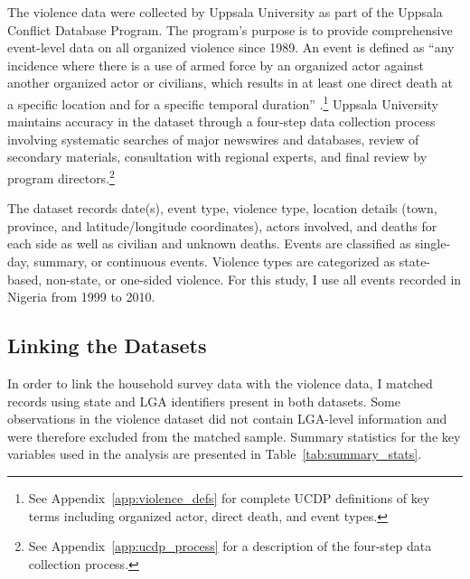 The violence data were collected by Uppsala University as part of the
Uppsala Conflict Database Program. The program's purpose is to provide
comprehensive event-level data on all organized violence since 1989. An
event is defined as ``any incidence where there is a use of armed force by
an organized actor against another organized actor or civilians, which
results in at least one direct death at a specific location and for a
specific temporal duration'' \citep{sundberg2010}.\footnote{See
Appendix~\ref{app:violence_defs} for complete UCDP definitions of key
terms including organized actor, direct death, and event types.} Uppsala
University maintains accuracy in the dataset through a four-step data
collection process involving systematic searches of major newswires and
databases, review of secondary materials, consultation with regional
experts, and final review by program directors.\footnote{See
Appendix~\ref{app:ucdp_process} for a description of the four-step data
collection process.}

The dataset records date(s), event type, violence type, location details
(town, province, and latitude/longitude coordinates), actors involved, and
deaths for each side as well as civilian and unknown deaths. Events are
classified as single-day, summary, or continuous events. Violence types are
categorized as state-based, non-state, or one-sided violence. For this
study, I use all events recorded in Nigeria from 1999 to 2010.

\subsection{Linking the Datasets}

In order to link the household survey data with the violence data, I matched
records using state and LGA identifiers present in both datasets. Some
observations in the violence dataset did not contain LGA-level information
and were therefore excluded from the matched sample. Summary statistics for
the key variables used in the analysis are presented in
Table~\ref{tab:summary_stats}.


